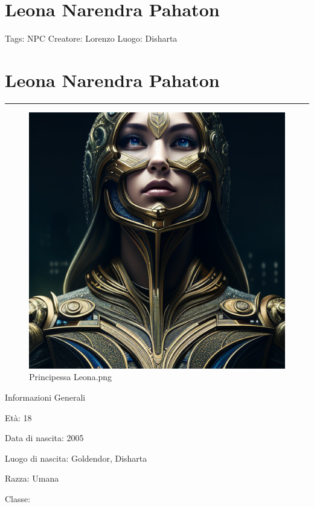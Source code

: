 \section{Leona Narendra Pahaton}\label{leona-narendra-pahaton}

Tags: NPC Creatore: Lorenzo Luogo: Disharta

\section{\texorpdfstring{\textbf{Leona Narendra
Pahaton}}{Leona Narendra Pahaton}}\label{leona-narendra-pahaton-1}

\begin{center}\rule{0.5\linewidth}{0.5pt}\end{center}

\begin{figure}
\centering
\includegraphics{Principessa_Leona.png}
\caption{Principessa Leona.png}
\end{figure}

Informazioni Generali

Età: 18

Data di nascita: 2005

Luogo di nascita: Goldendor, Disharta

Razza: Umana

Classe:

